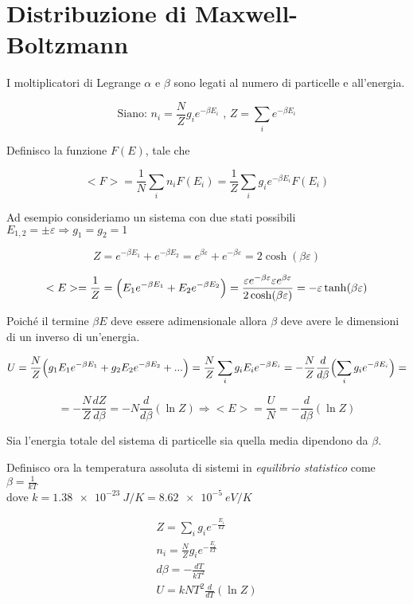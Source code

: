 
\section{Distribuzione di Maxwell-Boltzmann}


I moltiplicatori di Legrange $\alpha$ e $\beta$ sono legati al numero di particelle e all'energia.

$$ \mbox{Siano: }  n_i = \frac{N}{Z} g_i e^{ - \beta E_i }  \mbox{ , }  Z = \sum_i e^{ - \beta E_i } $$

Definisco la funzione $F(E)$, tale che

$$ < F > =  \frac{1}{N} \sum_i n_i F(E_i) = \frac{1}{Z} \sum_i g_i e^{- \beta E_i} F(E_i) $$

Ad esempio consideriamo un sistema con due stati possibili $E_{1,2} = \pm \varepsilon  \Rightarrow g_1 = g_2 = 1 $ 

$$ Z = e^{ - \beta E_1 } + e^{ - \beta E_2 } = e^{ \beta \varepsilon } + e^{ - \beta \varepsilon } = 2 \cosh ( \beta \varepsilon ) $$

$$  < E > = \frac{1}{Z} = \Bigl(  E_1  e^{ - \beta E_1 } + E_2 e^{ - \beta E_2 }  \Bigr)
= \frac{ \varepsilon e^{-\beta \varepsilon }   \varepsilon e^{\beta \varepsilon }}{2 \cosh (\beta \varepsilon )}  = -  \varepsilon \tanh (\beta \varepsilon ) $$

Poiché il termine $\beta E $ deve essere adimensionale allora $\beta$ deve avere le dimensioni di un inverso di un'energia.

$$  U = \frac{N}{Z} \Bigl( g_1 E_1 e^{ - \beta E_1 } + g_2 E_2 e^{ - \beta E_2 }  + ... \Bigr)  
= \frac{N}{Z} \sum_i g_i E_i e^{- \beta E_i} = - \frac{N}{Z}  \frac{d}{d\beta} \Bigl( \sum_i g_i e^{- \beta E_i}  \Bigr) = $$

$$ = - \frac{N}{Z} \frac{d Z}{d \beta} = - N \frac{d}{d \beta} (\ln Z) \Rightarrow < E > = \frac{U}{N} = - \frac{d}{d \beta} ( \ln Z ) $$ 

Sia l'energia totale del sistema di particelle sia quella media dipendono da $\beta$.

Definisco ora la temperatura assoluta di sistemi in \textit{ equilibrio statistico } come $\beta = \frac{1}{k T} $ \\
dove $k = \SI{1.38e-23}{J/K} = \SI{8.62e-5}{eV/K}$

\begin{gather*} 
Z = \sum_i g_i e^{- \frac{E_i}{k T}}  \\
n_i = \frac{N}{Z} g_i e^{- \frac{E_i}{k T}}  \\
d\beta =  - \frac{d T}{k T^2} \\
U = k N T^2 \frac{d}{d T}(\ln Z)
\end{gather*}

